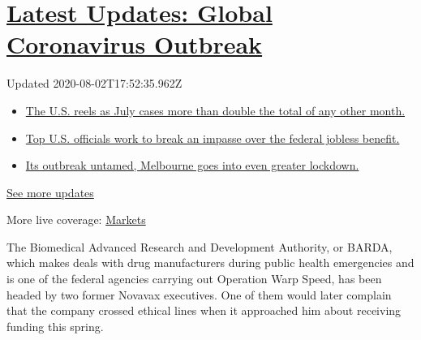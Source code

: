 \hypertarget{latest-updates-global-coronavirus-outbreak}{%
\section{\texorpdfstring{\href{https://www.nytimes3xbfgragh.onion/2020/08/01/world/coronavirus-covid-19.html?action=click\&pgtype=Article\&state=default\&region=MAIN_CONTENT_1\&context=storylines_live_updates}{Latest
Updates: Global Coronavirus
Outbreak}}{Latest Updates: Global Coronavirus Outbreak}}\label{latest-updates-global-coronavirus-outbreak}}

Updated 2020-08-02T17:52:35.962Z

\begin{itemize}
\tightlist
\item
  \href{https://www.nytimes3xbfgragh.onion/2020/08/01/world/coronavirus-covid-19.html?action=click\&pgtype=Article\&state=default\&region=MAIN_CONTENT_1\&context=storylines_live_updates\#link-34047410}{The
  U.S. reels as July cases more than double the total of any other
  month.}
\item
  \href{https://www.nytimes3xbfgragh.onion/2020/08/01/world/coronavirus-covid-19.html?action=click\&pgtype=Article\&state=default\&region=MAIN_CONTENT_1\&context=storylines_live_updates\#link-780ec966}{Top
  U.S. officials work to break an impasse over the federal jobless
  benefit.}
\item
  \href{https://www.nytimes3xbfgragh.onion/2020/08/01/world/coronavirus-covid-19.html?action=click\&pgtype=Article\&state=default\&region=MAIN_CONTENT_1\&context=storylines_live_updates\#link-2bc8948}{Its
  outbreak untamed, Melbourne goes into even greater lockdown.}
\end{itemize}

\href{https://www.nytimes3xbfgragh.onion/2020/08/01/world/coronavirus-covid-19.html?action=click\&pgtype=Article\&state=default\&region=MAIN_CONTENT_1\&context=storylines_live_updates}{See
more updates}

More live coverage:
\href{https://www.nytimes3xbfgragh.onion/live/2020/07/31/business/stock-market-today-coronavirus?action=click\&pgtype=Article\&state=default\&region=MAIN_CONTENT_1\&context=storylines_live_updates}{Markets}

The Biomedical Advanced Research and Development Authority, or BARDA,
which makes deals with drug manufacturers during public health
emergencies and is one of the federal agencies carrying out Operation
Warp Speed, has been headed by two former Novavax executives. One of
them would later complain that the company crossed ethical lines when it
approached him about receiving funding this spring.

